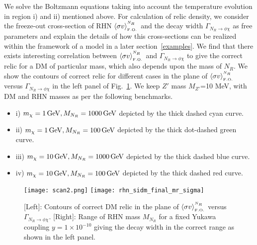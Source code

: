 \documentclass[prd,nofootinbib,preprint,superscriptaddress]{revtex4}
\begin{document}
		We solve the Boltzmann equations taking into account the temperature evolution in region i) and ii) mentioned above. For calculation of relic density, we consider the freeze-out cross-section of RHN $\langle\sigma v \rangle^{^{N_R}}_{_{ \rm F.O.}}$ and the decay width $\Gamma_{N_R \to \phi \chi}$ as free parameters and explain the details of how this cross-sections can be realized within the framework of a model in a later section~\ref{examples}. We find that there exists interesting correlation between $\langle\sigma v \rangle^{^{N_R}}_{_{ \rm F.O.}}$ and $\Gamma_{N_R \to \phi \chi}$ to give the correct relic for a DM of particular mass, which also depends upon the mass of $N_R$. We show the contours of correct relic for different cases in the plane of  $\langle\sigma v \rangle^{^{N_R}}_{_{ \rm F.O.}}$ versus $\Gamma_{N_R \to \phi \chi}$ in the left panel of Fig.~\ref{relic_scan}. We keep $Z'$ mass $M_{Z'}$=10 MeV, with DM and RHN masses as per the following benchmarks.
		
		\begin{itemize}
			\item i) $m_\chi = 1 \,{\rm GeV}, M_{N_R} = 1000 \,{\rm GeV}$ depicted by the thick dashed cyan curve.
			\item ii) $m_\chi = 1 \,{\rm GeV}, M_{N_R} = 100\, {\rm GeV}$ depicted by the thick dot-dashed green curve.
			\item iii) $m_\chi = 10\, {\rm GeV}, M_{N_R} = 1000\, {\rm GeV}$ depicted by the thick dashed blue curve.
			\item iv) $m_\chi = 10 \,{\rm GeV}, M_{N_R} = 100\, {\rm GeV}$ depicted by the thick  dashed red curve.
		\end{itemize}
		
		\begin{figure}[h!]
			\centering
			\texttt{[image: scan2.png]}
			\texttt{[image: rhn\_sidm\_final\_mr\_sigma]}
			\caption{[Left]: Contours of correct DM relic in the plane of $\langle\sigma v \rangle^{^{N_R}}_{_{ \rm F.O.}}$ versus $\Gamma_{N_R \to \phi \chi}$. [Right]: Range of RHN mass $M_{N_R}$ for a fixed Yukawa coupling $y=1\times 10^{-10}$ giving the decay width in the correct range as shown in the left panel.}%
	\label{relic_scan}
\end{figure} 
\end{document}
